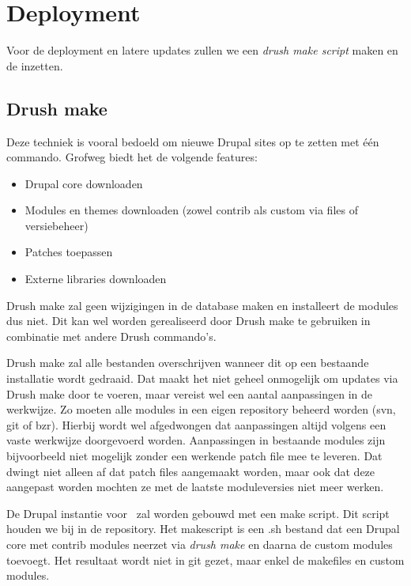 \section{Deployment}\label{deployment}

Voor de deployment en latere updates zullen we een \emph{drush make script} maken en de  inzetten.

\subsection{Drush make}

Deze techniek is vooral bedoeld om nieuwe Drupal sites op te zetten met \'{e}\'{e}n commando. Grofweg biedt het de volgende features:

\begin{itemize}
  \item Drupal core downloaden
  \item Modules en themes downloaden (zowel contrib als custom via files of versiebeheer)
  \item Patches toepassen
  \item Externe libraries downloaden
\end{itemize}

Drush make zal geen wijzigingen in de database maken en installeert de modules dus niet. Dit kan wel worden gerealiseerd door Drush make te gebruiken in combinatie met andere Drush commando's.

Drush make zal alle bestanden overschrijven wanneer dit op een bestaande installatie wordt gedraaid. Dat maakt het niet geheel onmogelijk om updates via Drush make door te voeren, maar vereist wel een aantal aanpassingen in de werkwijze. Zo moeten alle modules in een eigen repository beheerd worden (svn, git of bzr). Hierbij wordt wel afgedwongen dat aanpassingen altijd volgens een vaste werkwijze doorgevoerd worden. Aanpassingen in bestaande modules zijn bijvoorbeeld niet mogelijk zonder een werkende patch file mee te leveren. Dat dwingt niet alleen af dat patch files aangemaakt worden, maar ook dat deze aangepast worden mochten ze met de laatste moduleversies niet meer werken.

De Drupal instantie voor \thecustomer \ zal worden gebouwd met een make script. Dit script houden we bij in de repository. Het makescript is een .sh bestand dat een Drupal core met contrib modules neerzet via \emph{drush make} en daarna de custom modules toevoegt. Het resultaat wordt niet in git gezet, maar enkel de makefiles en custom modules.

